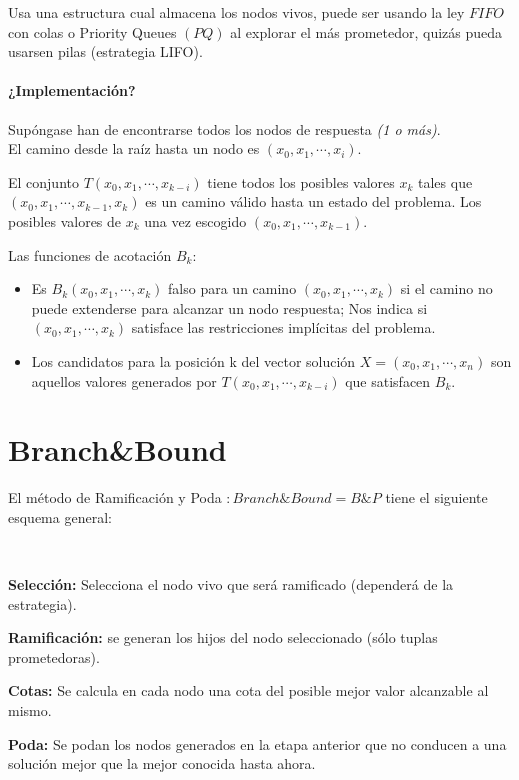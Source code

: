 \documentclass[tikz,11pt,fleqn]{book} %
\begin{document}
Usa una estructura cual almacena los nodos vivos, puede ser usando la ley $FIFO$ con colas o Priority Queues $(PQ)$ al explorar el más prometedor, quizás pueda usarsen pilas (estrategia LIFO).

\subsubsection{¿Implementación?}
\begin{definition}[Implementación]

    Supóngase han de encontrarse todos los nodos de respuesta \textit{(1 o más)}.\\
    
    El camino desde la raíz hasta un nodo es $(x_0,x_1,\cdots,x_i)$. 
    
    El conjunto $T(x_0,x_1,\cdots,x_{k-i})$ tiene todos los posibles valores $x_k$ tales que $(x_0,x_1,\cdots,x_{k-1},x_k)$ es un camino válido hasta un estado del problema. Los posibles valores
    de $x_k$ una vez escogido $(x_0,x_1,\cdots,x_{k-1})$.
    
    Las funciones de acotación $B_k$:
    \begin{itemize}
        \item Es $B_k(x_0,x_1,\cdots,x_k)$ falso para un camino $(x_0,x_1,\cdots, x_k)$ si el camino no puede extenderse para alcanzar un nodo respuesta; Nos indica si $(x_0,x_1,\cdots,x_k)$ satisface las restricciones implícitas del problema.
        
        \item Los candidatos para la posición k del vector solución $X=(x_0,x_1,\cdots,x_n)$ son aquellos valores generados por $T(x_0,x_1,\cdots,x_{k-i})$ que satisfacen $B_k$.
    \end{itemize}
\end{definition}

\chapter{Branch\&Bound}
El método de Ramificación y Poda $:Branch\&Bound=B\&P$ tiene el siguiente esquema general:

\begin{theorem}~

    \textbf{Selección:} Selecciona el nodo vivo que será ramificado (dependerá de la estrategia).
    
    \textbf{Ramificación:} se generan los hijos del nodo seleccionado (sólo tuplas prometedoras).

    \textbf{Cotas:} Se calcula en cada nodo una cota del posible mejor valor alcanzable al mismo.

    \textbf{Poda:} Se podan los nodos generados en la etapa anterior que no conducen a una solución mejor que la mejor conocida hasta ahora.
\end{theorem}
\end{document}

